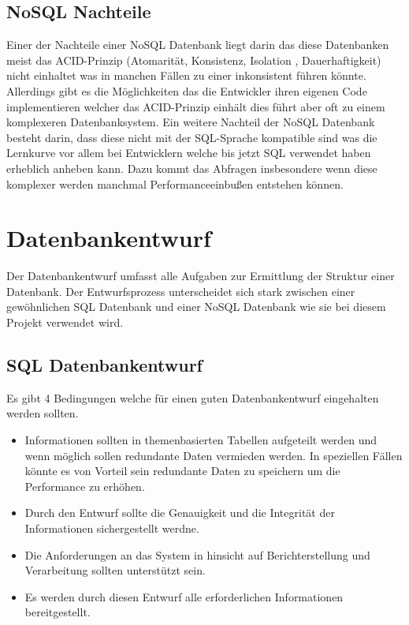 	\subsection{NoSQL Nachteile}
		Einer der Nachteile einer NoSQL Datenbank liegt darin das diese Datenbanken meist das ACID-Prinzip (Atomarität, Konsistenz, Isolation , Dauerhaftigkeit) nicht einhaltet was in manchen Fällen zu einer inkonsistent führen könnte. Allerdings gibt es die Möglichkeiten das die Entwickler ihren eigenen Code implementieren welcher das ACID-Prinzip einhält dies führt aber oft zu einem komplexeren Datenbanksystem. Ein weitere Nachteil der NoSQL Datenbank besteht darin, dass diese nicht mit der SQL-Sprache kompatible sind was die Lernkurve vor allem bei Entwicklern welche bis jetzt SQL verwendet haben erheblich anheben kann. Dazu kommt das Abfragen insbesondere wenn diese komplexer werden manchmal Performanceeinbußen entstehen können.
		

	\section{Datenbankentwurf}
		Der Datenbankentwurf umfasst alle Aufgaben zur Ermittlung der Struktur einer Datenbank. Der Entwurfsprozess unterscheidet sich stark zwischen einer gewöhnlichen SQL Datenbank und einer NoSQL Datenbank wie sie bei diesem Projekt verwendet wird.
		
		\subsection{SQL Datenbankentwurf}
			Es gibt 4 Bedingungen welche für einen guten Datenbankentwurf eingehalten werden sollten.

			\begin{itemize}
				\item Informationen sollten in themenbasierten Tabellen aufgeteilt werden und wenn möglich sollen redundante Daten vermieden werden. In speziellen Fällen könnte es von Vorteil sein redundante Daten zu speichern um die Performance zu erhöhen.
				\item Durch den Entwurf sollte die Genauigkeit und die Integrität der Informationen sichergestellt werdne.
				\item Die Anforderungen an das System in hinsicht auf Berichterstellung und Verarbeitung sollten unterstützt sein.
				\item Es werden durch diesen Entwurf alle erforderlichen Informationen bereitgestellt. 
			\end{itemize}
			

